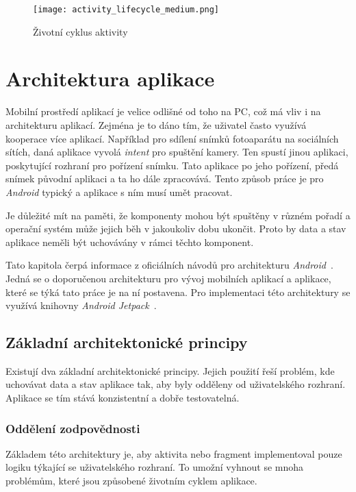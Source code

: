 \begin{figure}[h!]
    \centering
    \vspace{0.5cm}
    \texttt{[image: activity\_lifecycle\_medium.png]}
    \caption[Životní cyklus aktivity]{Životní cyklus aktivity~\cite{activity-life-cycle}}
    \label{diagram:activity_lifecycle}
\end{figure}

\newpage
\section{Architektura aplikace}
 Mobilní prostředí aplikací je velice odlišné od toho na PC, což má vliv i na architekturu aplikací. Zejména je to dáno tím, že uživatel často využívá kooperace více aplikací. Například pro sdílení snímků fotoaparátu na sociálních sítích, daná aplikace vyvolá \emph{intent} pro spuštění kamery. Ten spustí jinou aplikaci, poskytující rozhraní pro pořízení snímku. Tato aplikace po jeho pořízení, předá snímek původní aplikaci a ta ho dále zpracovává. Tento způsob práce je pro \emph{Android} typický a aplikace s ním musí umět pracovat.

 Je důležité mít na paměti, že komponenty mohou být spuštěny v různém pořadí a operační systém může jejich běh v jakoukoliv dobu ukončit. Proto by data a stav aplikace neměli být uchovávány v rámci těchto komponent.
 
 Tato kapitola čerpá informace z oficiálních návodů pro architekturu \emph{Android}~. Jedná se o doporučenou architekturu pro vývoj mobilních aplikací a aplikace, které se týká tato práce je na ní postavena. Pro implementaci této architektury se využívá knihovny \emph{Android Jetpack}~.

    \subsection{Základní architektonické principy}
    Existují dva základní architektonické principy. Jejich použití řeší problém, kde uchovávat data a stav aplikace tak, aby byly odděleny od uživatelského rozhraní. Aplikace se tím stává konzistentní a dobře testovatelná.

        \subsubsection{Oddělení zodpovědnosti}
        Základem této architektury je, aby aktivita nebo fragment implementoval pouze logiku týkající se uživatelského rozhraní. To umožní vyhnout se mnoha problémům, které jsou způsobené životním cyklem aplikace.

